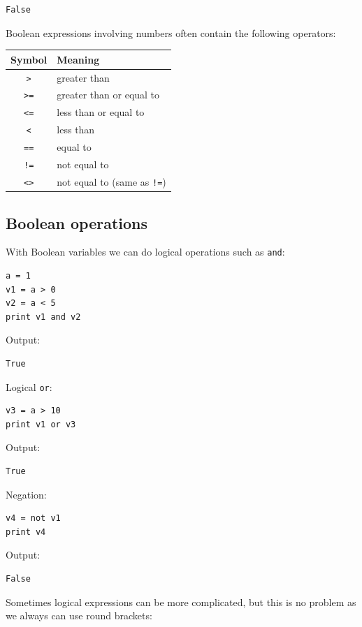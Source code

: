 \begin{verbatim}
False
\end{verbatim}
Boolean expressions involving numbers often contain the following operators:

\begin{center}
\begin{tabular}{|c|l|}
\hline
Symbol & Meaning \\
\hline
{\tt >} & greater than\\
{\tt >=} & greater than or equal to\\
{\tt <=} & less than or equal to\\
{\tt <} & less than\\
{\tt ==} & equal to\\
{\tt !=} & not equal to\\
{\tt <>} & not equal to (same as {\tt !=})\\
\hline
\end{tabular}
\end{center}

\subsection{Boolean operations}

With Boolean variables we can do logical operations such as {\tt and}:

\begin{verbatim}
a = 1
v1 = a > 0
v2 = a < 5
print v1 and v2
\end{verbatim}
Output:

\begin{verbatim}
True
\end{verbatim}
Logical {\tt or}:

\begin{verbatim}
v3 = a > 10
print v1 or v3
\end{verbatim}
Output:

\begin{verbatim}
True
\end{verbatim}
Negation:

\begin{verbatim}
v4 = not v1
print v4
\end{verbatim}
Output:

\begin{verbatim}
False
\end{verbatim}
Sometimes logical expressions can be more complicated, but this is no problem
as we always can use round brackets: 

